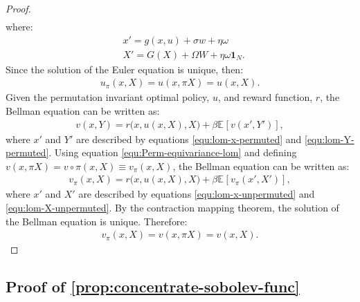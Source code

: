 \documentclass[12pt]{article}
\newcommand{\expec}[2][]{\ensuremath{\mathbb{E}_{{#1}}\left[ {#2} \right]}}
\begin{document}
\begin{proof}
\begin{align*}
\end{align*}
where: 
\begin{align}
& x' = g(x,u) + \sigma w + \eta \omega \label{equ:lom-x-unpermuted}\\
& X' =  G(X)+ \Omega W+\eta \omega \mathbf{1}_N\label{equ:lom-X-unpermuted}.
\end{align}
Since the solution of the Euler equation is unique, then:
\begin{align*}
u_\pi(x,X) = u(x,\pi X) = u(x,X).
\end{align*}
Given the permutation invariant optimal policy, $u$, and reward function, $r$, the Bellman equation can be written as:
\begin{align*}
v(x,Y) = r\big(x,u(x,X),X\big)+ \beta \expec{v(x',Y')},
\end{align*}	
where $x'$ and $Y'$ are described by equations \cref{equ:lom-x-permuted} and \cref{equ:lom-Y-permuted}. Using equation \cref{equ:Perm-equivariance-lom} and defining $v(x,\pi X) = v\circ \pi (x,X) \equiv v_\pi(x,X)$, the Bellman equation can be written as:
\begin{align*}
v_\pi(x,X) = r\big(x,u(x,X),X\big)+ \beta \expec{v_\pi(x',X')},
\end{align*}
where $x'$ and $X'$ are described by equations \cref{equ:lom-x-unpermuted} and \cref{equ:lom-X-unpermuted}. By the contraction mapping theorem, the solution of the Bellman equation is unique. Therefore:
\begin{align*}
v_\pi(x,X) = v(x,\pi X) = v(x,X).
\end{align*}
\end{proof}

\subsection{Proof of \cref{prop:concentrate-sobolev-func}}\label{sec:concentrate-soblov-func-proof}
\end{document}
